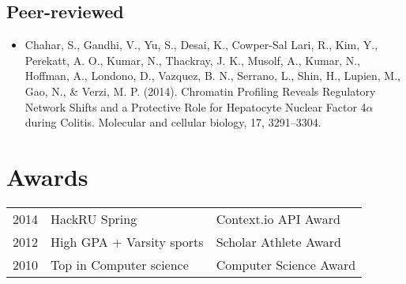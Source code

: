 \documentclass[letterpaper]{deedy-resume} %
\begin{document}
\begin{minipage}[t]{0.66\textwidth}
\subsection{Peer-reviewed}
\begin{itemize}
\item Chahar, S., Gandhi, V., Yu, S., Desai, K., Cowper-Sal Lari, R., Kim, Y., Perekatt, A. O., Kumar, N., Thackray, J. K., Musolf, A., Kumar, N., Hoffman, A., Londono, D., Vazquez, B. N., Serrano, L., Shin, H., Lupien, M., Gao, N., \& Verzi, M. P. (2014). Chromatin Profiling Reveals Regulatory Network Shifts and a Protective Role for Hepatocyte Nuclear Factor 4$\alpha$ during Colitis. Molecular and cellular biology, 17, 3291–3304.
\end{itemize}

\section{Awards} 

\begin{tabular}{l l l}
2014 & HackRU Spring & Context.io API Award \\
2012 & High GPA + Varsity sports & Scholar Athlete Award \\
2010 & Top in Computer science & Computer Science Award\\
\end{tabular}

\sectionspace %



\sectionspace %


\end{minipage} %




\end{document}
